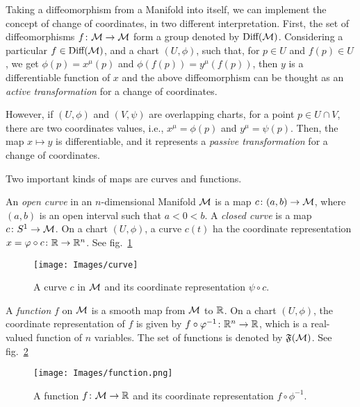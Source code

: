 Taking a diffeomorphism from a Manifold into itself, we can implement the concept of change of coordinates, in two different interpretation. First, the set of diffeomorphisms $f\colon \mathcal{M} \to \mathcal{M}$ form a group denoted by $\textup{Diff}(\mathcal{M})$. Considering a particular $f \in \textup{Diff}(\mathcal{M})$, and a chart $(U, \phi)$, such that, for $p \in U$ and $f(p) \in U$, we get $\phi(p) = x^\mu(p)$ and $\phi(f(p))=y^\mu(f(p))$, then $y$ is a differentiable function of $x$ and the above diffeomorphism can be thought as an \emph{active transformation} for a change of coordinates.

However, if $(U,\phi)$ and $(V,\psi)$ are overlapping charts, for a point $p \in U \cap V$, there are two coordinates values, i.e., $x^\mu = \phi(p)$ and $y^\mu = \psi(p)$. Then, the map $x \mapsto y$ is differentiable, and it represents a \emph{passive transformation} for a change of coordinates.

Two important kinds of maps are curves and functions.

\begin{definition}[Curve]
    An \emph{open curve} in an $n$-dimensional Manifold $\mathcal{M}$ is a map $c \colon (a,b) \to \mathcal{M}$, where $(a,b)$ is an open interval such that $a<0<b$. A \emph{closed curve} is a map $c \colon S^1 \to \mathcal{M}$. On a chart $(U,\phi)$, a curve $c(t)$ ha the coordinate representation $x=\varphi \circ c \colon \mathbb{R} \to \mathbb{R}^n$. See fig.~\ref{fig:curve}
\end{definition}

\begin{figure}
    \centering
    \texttt{[image: Images/curve]}
    \caption{A curve $c$ in $\mathcal{M}$ and its coordinate representation $\psi \circ c$.}
    \label{fig:curve}
\end{figure}

\begin{definition}[Function]
    A \emph{function} $f$ on $\mathcal{M}$ is a smooth map from $\mathcal{M}$ to $\mathbb{R}$. On a chart $(U,\phi)$, the coordinate representation of $f$ is given by $f \circ \varphi^{-1} \colon \mathbb{R}^n \to \mathbb{R}$, which is a real-valued function of $n$ variables. The set of functions is denoted by $\mathfrak{F}(\mathcal{M})$. See fig.~\ref{fig:function}
\end{definition}

\begin{figure}
    \centering
    \texttt{[image: Images/function.png]}
    \caption{A function $f\colon \mathcal{M} \to \mathbb{R}$ and its coordinate representation $f \circ \phi^{-1}$.}
    \label{fig:function}
\end{figure}

